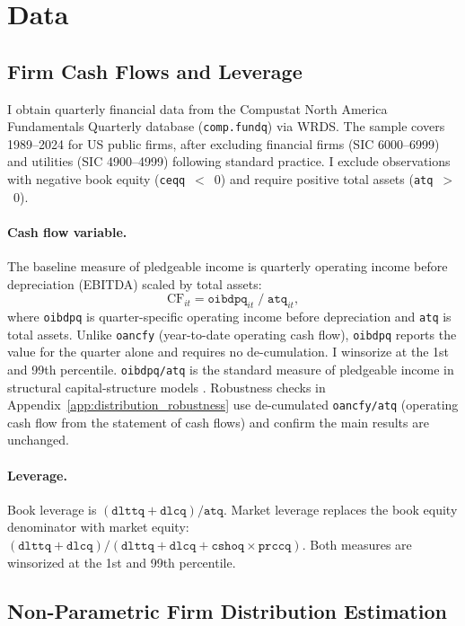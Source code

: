 \section{Data}
\label{sec:data}

\subsection{Firm Cash Flows and Leverage}

I obtain quarterly financial data from the Compustat North America Fundamentals Quarterly database (\texttt{comp.fundq}) via WRDS. The sample covers 1989--2024 for US public firms, after excluding financial firms (SIC 6000--6999) and utilities (SIC 4900--4999) following standard practice. I exclude observations with negative book equity (\texttt{ceqq}~$<$~0) and require positive total assets (\texttt{atq}~$>$~0).

\paragraph{Cash flow variable.} The baseline measure of pledgeable income is quarterly operating income before depreciation (EBITDA) scaled by total assets:
\[
  \text{CF}_{it} = \texttt{oibdpq}_{it}\;/\;\texttt{atq}_{it},
\]
where \texttt{oibdpq} is quarter-specific operating income before depreciation and \texttt{atq} is total assets. Unlike \texttt{oancfy} (year-to-date operating cash flow), \texttt{oibdpq} reports the value for the quarter alone and requires no de-cumulation. I winsorize at the 1st and 99th percentile. \texttt{oibdpq/atq} is the standard measure of pledgeable income in structural capital-structure models \citep{HennessyWhited2005debt,Strebulaev2007tests}. Robustness checks in Appendix~\ref{app:distribution_robustness} use de-cumulated \texttt{oancfy/atq} (operating cash flow from the statement of cash flows) and confirm the main results are unchanged.

\paragraph{Leverage.} Book leverage is $(\texttt{dlttq} + \texttt{dlcq})/\texttt{atq}$. Market leverage replaces the book equity denominator with market equity: $(\texttt{dlttq} + \texttt{dlcq})/(\texttt{dlttq} + \texttt{dlcq} + \texttt{cshoq} \times \texttt{prccq})$. Both measures are winsorized at the 1st and 99th percentile.

\subsection{Non-Parametric Firm Distribution Estimation}

